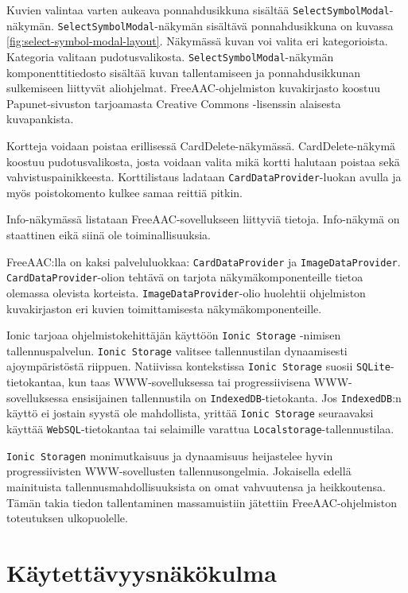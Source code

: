 \documentclass[utf8]{gradu3}
\begin{document}
Kuvien valintaa varten aukeava ponnahdusikkuna sisältää \texttt{SelectSymbolModal}-näkymän. \texttt{SelectSymbolModal}-näkymän sisältävä ponnahdusikkuna on kuvassa \ref{fig:select-symbol-modal-layout}. Näkymässä kuvan voi valita eri kategorioista. Kategoria valitaan pudotusvalikosta. \texttt{SelectSymbolModal}-näkymän komponenttitiedosto sisältää kuvan tallentamiseen ja ponnahdusikkunan sulkemiseen liittyvät aliohjelmat. FreeAAC-ohjelmiston kuvakirjasto koostuu Papunet-sivuston tarjoamasta Creative Commons -lisenssin alaisesta kuvapankista.

Kortteja voidaan poistaa erillisessä CardDelete-näkymässä. CardDelete-näkymä koostuu pudotusvalikosta, josta voidaan valita mikä kortti halutaan poistaa sekä vahvistuspainikkeesta. Korttilistaus ladataan \texttt{CardDataProvider}-luokan avulla ja myös poistokomento kulkee samaa reittiä pitkin.

Info-näkymässä listataan FreeAAC-sovellukseen liittyviä tietoja. Info-näkymä on staattinen eikä siinä ole toiminallisuuksia.

FreeAAC:lla on kaksi palveluluokkaa: \texttt{CardDataProvider} ja \texttt{ImageDataProvider}. \texttt{CardDataProvider}-olion tehtävä on tarjota näkymäkomponenteille tietoa olemassa olevista korteista. \texttt{ImageDataProvider}-olio huolehtii ohjelmiston kuvakirjaston eri kuvien toimittamisesta näkymäkomponenteille.

Ionic tarjoaa ohjelmistokehittäjän käyttöön \texttt{Ionic Storage} -nimisen tallennuspalvelun. \texttt{Ionic Storage} valitsee tallennustilan dynaamisesti ajoympäristöstä riippuen. Natiivissa kontekstissa \texttt{Ionic Storage} suosii \texttt{SQLite}-tietokantaa, kun taas WWW-sovelluksessa tai progressiivisena WWW-sovelluksessa ensisijainen tallennustila on \texttt{IndexedDB}-tietokanta. Jos \texttt{IndexedDB}:n käyttö ei jostain syystä ole mahdollista, yrittää \texttt{Ionic Storage} seuraavaksi käyttää \texttt{WebSQL}-tietokantaa tai selaimille varattua \texttt{Localstorage}-tallennustilaa.

\texttt{Ionic Storagen} monimutkaisuus ja dynaamisuus heijastelee hyvin progressiivisten WWW-sovellusten tallennusongelmia. Jokaisella edellä mainituista tallennusmahdollisuuksista on omat vahvuutensa ja heikkoutensa. Tämän takia tiedon tallentaminen massamuistiin jätettiin FreeAAC-ohjelmiston toteutuksen ulkopuolelle.

\section{Käytettävyysnäkökulma}
\end{document}
